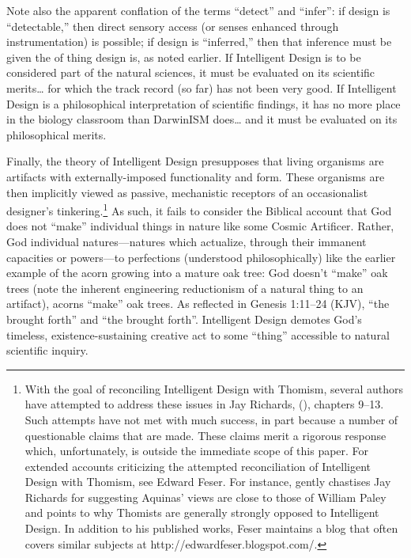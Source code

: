 Note also the apparent conflation of the terms ``detect'' and ``infer'': if design is ``detectable,'' then direct sensory access (or senses enhanced through instrumentation) is possible; if design is ``inferred,'' then that inference must be  given the  of thing design is, as noted earlier. If Intelligent Design is to be considered part of the natural sciences, it must be evaluated on its scientific merits\ldots{} for which the track record (so far) has not been very good. If Intelligent Design is a philosophical interpretation of scientific findings, it has no more place in the biology classroom than DarwinISM does\ldots{} and it must be evaluated on its philosophical merits.

Finally, the theory of Intelligent Design presupposes that living organisms are artifacts with externally-imposed functionality and form. These organisms are then implicitly viewed as passive, mechanistic receptors of an occasionalist designer's tinkering.\footnote{With the goal of reconciling Intelligent Design with Thomism, several authors have attempted to address these issues in Jay Richards,  (\citeyear{richards2010}), chapters 9--13. Such attempts have not met with much success, in part because a number of questionable claims that are made. These claims merit a rigorous response which, unfortunately, is outside the immediate scope of this paper.  For extended accounts criticizing the attempted reconciliation of Intelligent Design with Thomism, see Edward Feser.  For instance, \citet[][pp.~724,~745]{feser2013} gently chastises Jay Richards for suggesting Aquinas' views are close to those of William Paley and points to why Thomists are generally strongly opposed to Intelligent Design.  In addition to his published works, Feser maintains a blog that often covers similar subjects at http://edwardfeser.blogspot.com/.} 
As such, it fails to consider the Biblical account that God does not ``make'' individual things in nature like some Cosmic Artificer. Rather, God  individual natures---natures which actualize, through their immanent capacities or powers---to perfections (understood philosophically) like the earlier example of the acorn growing into a mature oak tree: God doesn't ``make'' oak trees (note the inherent engineering reductionism of a natural thing to an artifact), acorns ``make'' oak trees. As reflected in Genesis 1:11--24 (KJV), ``the  brought forth'' and ``the  brought forth''. Intelligent Design demotes God's timeless, existence-sustaining creative act to some ``thing'' accessible to natural scientific inquiry.

